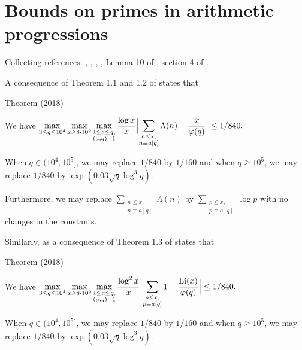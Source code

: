 \section{Bounds on primes in arithmetic progressions}


Collecting references:
\cite{McCurley*84-2},
\cite{McCurley*84-3},
\cite{Ramare-Rumely*96},
\cite{Dusart*01},
Lemma 10 of \cite{Moree*04},
section 4 of
\cite{Moree-teRiele*04}.

A consequence of Theorem 1.1 and 1.2 of
\cite{Bennett-Martin-OBryant-Rechnitzer*18}
states that
\begin{thm}{Theorem (2018)}

  We have
  $\displaystyle
  \max_{3\le q\le 10^4}\max_{ x\ge 8\cdot 10^9}\max_{\substack{1\le a\le q,\\
  (a,q)=1}}
  \frac{\log x}{x}\Bigl|
  \sum_{\substack{n\le x,\\ n\equiv a[q]}}\Lambda(n)
  -\frac{x}{\varphi(q)}\Bigr|\le 1/840.
  $
  \par 
  When $q\in(10^4, 10^5]$, we may replace $1/840$ by $1/160$ and when
  $q\ge 10^5$, we may replace $1/840$ by $\exp(0.03\sqrt{q}\log^3q)$.
  \par 
    Furthermore, we may replace
  $\sum_{\substack{n\le x,\\ n\equiv a[q]}}\Lambda(n)$ by
  $\sum_{\substack{p\le x,\\ p\equiv a[q]}}\log p$ with no changes in
  the constants. 
\end{thm}

Similarly, as a consequence of Theorem 1.3 of
\cite{Bennett-Martin-OBryant-Rechnitzer*18}
states that
\begin{thm}{Theorem (2018)}

  We have
  $\displaystyle
  \max_{3\le q\le 10^4}\max_{ x\ge 8\cdot 10^9}\max_{\substack{1\le a\le q,\\
  (a,q)=1}}
  \frac{\log^2 x}{x}\Bigl|
  \sum_{\substack{p\le x,\\ p\equiv a[q]}}1
  -\frac{\textrm{Li}(x)}{\varphi(q)}\Bigr|\le 1/840.
  $
  \par 
  When $q\in(10^4, 10^5]$, we may replace $1/840$ by $1/160$ and when
  $q\ge 10^5$, we may replace $1/840$ by $\exp(0.03\sqrt{q}\log^3q)$.
\end{thm}





